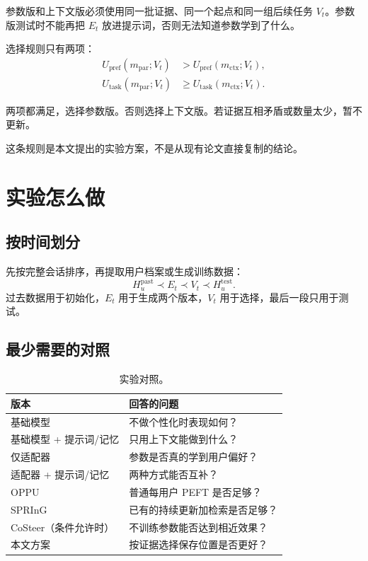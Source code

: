 \documentclass[11pt,UTF8,fontset=fandol]{ctexart}
\newcommand{\prefscore}{U_{\mathrm{pref}}}
\newcommand{\taskscore}{U_{\mathrm{task}}}
\begin{document}
参数版和上下文版必须使用同一批证据、同一个起点和同一组后续任务
\(V_t\)。参数版测试时不能再把 \(E_t\) 放进提示词，否则无法知道参数学到了什么。

选择规则只有两项：
\begin{equation}
  \begin{aligned}
  \prefscore(m_{\mathrm{par}};V_t)
    &> \prefscore(m_{\mathrm{ctx}};V_t),\\
  \taskscore(m_{\mathrm{par}};V_t)
    &\ge \taskscore(m_{\mathrm{ctx}};V_t).
  \end{aligned}
\end{equation}

两项都满足，选择参数版。否则选择上下文版。若证据互相矛盾或数量太少，暂不更新。

这条规则是本文提出的实验方案，不是从现有论文直接复制的结论。

\section{实验怎么做}

\subsection{按时间划分}

先按完整会话排序，再提取用户档案或生成训练数据：
\begin{equation}
  H_u^{\mathrm{past}}
  \prec E_t
  \prec V_t
  \prec H_u^{\mathrm{test}}.
\end{equation}
过去数据用于初始化，\(E_t\) 用于生成两个版本，\(V_t\) 用于选择，最后一段只用于测试。

\subsection{最少需要的对照}

\begin{table}[ht]
  \centering
  \caption{实验对照。}
  \begin{tabularx}{0.94\textwidth}{@{}L{0.32\textwidth}Y@{}}
    \toprule
    版本 & 回答的问题 \\
    \midrule
    基础模型 & 不做个性化时表现如何？ \\
    基础模型 + 提示词/记忆 & 只用上下文能做到什么？ \\
    仅适配器 & 参数是否真的学到用户偏好？ \\
    适配器 + 提示词/记忆 & 两种方式能否互补？ \\
    OPPU & 普通每用户 PEFT 是否足够？ \\
    SPRInG & 已有的持续更新加检索是否足够？ \\
    CoSteer（条件允许时） & 不训练参数能否达到相近效果？ \\
    本文方案 & 按证据选择保存位置是否更好？ \\
    \bottomrule
  \end{tabularx}
\end{table}
\end{document}
